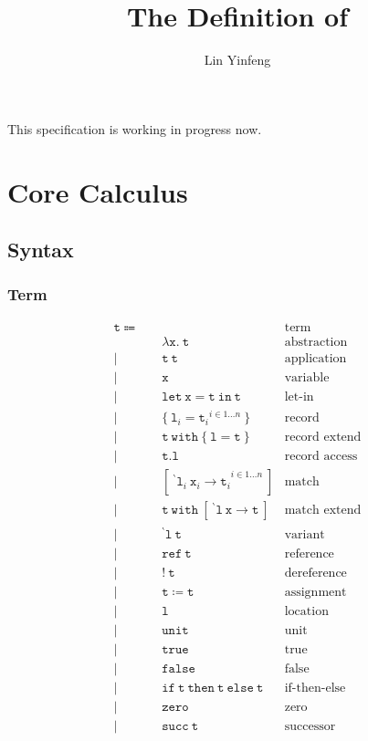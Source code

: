 \documentclass{article}
\title{The Definition of \theLang}
\author{Lin Yinfeng}
\newcommand{\code}{\mathtt}
\newcommand{\backtick}{{}^{\backprime}}
\begin{document}
\maketitle

This specification is working in progress now.

\section{Core Calculus}

\subsection{Syntax}

\subsubsection{Term}

\begin{align*}
\code{t} \Coloneqq \quad & & \text{term} \\
& \code{\lambda x.\ t} & \text{abstraction} \\
| \quad & \code{t\ t} & \text{application} \\
| \quad & \code{x} & \text{variable} \\
| \quad & \code{let\ x = t\ in\ t} & \text{let-in} \\
| \quad & \{\ {\code{l}_i = \code{t}_i}^{i \in 1\dots n}\ \} & \text{record} \\
| \quad & \code{t\ with\ \{\ l = t\ \}} & \text{record extend} \\
| \quad & \code{t.l} & \text{record access} \\
| \quad & [ {\code{\ \backtick l}_i\ \code{x}_i \rightarrow \code{t}_i}^{i \in 1\dots n} \ ] & \text{match} \\
| \quad & \code{t\ with\ [\ \backtick l\ x \rightarrow t\ ]} & \text{match extend} \\
| \quad & \code{\backtick l\ t} & \text{variant} \\
| \quad & \code{ref\ t} & \text{reference} \\
| \quad & \code{!\ t} & \text{dereference} \\
| \quad & \code{t \coloneqq t} & \text{assignment} \\
| \quad & \code{l} & \text{location} \\
| \quad & \code{unit} & \text{unit} \\
| \quad & \code{true} & \text{true} \\
| \quad & \code{false} & \text{false} \\
| \quad & \code{if\ t\ then\ t\ else\ t} & \text{if-then-else} \\
| \quad & \code{zero} & \text{zero} \\
| \quad & \code{succ\ t} & \text{successor}
\end{align*}
\end{document}
